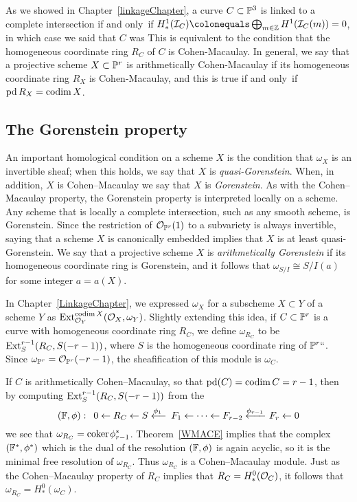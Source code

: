 As we showed in Chapter~\ref{linkageChapter}, a curve $C\subset \mathbb P^3$
is linked to a complete intersection
if and only~if
$H^1_*(\sI_C) \colonequals  \bigoplus_{m\in \ZZ} H^1(\sI_C(m)) = 0$,
in which case we said that $C$ was
%
This is equivalent to the condition that the homogeneous coordinate
ring $R_{C}$ of $C$ is Cohen-Macaulay.
In general, we say that a projective scheme $X\subset \mathbb P^{r}$
is arithmetically Cohen-Macaulay if its homogeneous coordinate ring $R_{X}$
is Cohen-Macaulay, and this is true
if and only~if $\operatorname{pd} R_X = \operatorname{codim} X$. 

\subsection*{The Gorenstein property}
An important homological condition on a scheme $X$ is the condition that
$\omega_X$ is an invertible sheaf; when this holds, we say that $X$
is \emph{quasi-Gorenstein}. When, in addition, $X$ is Cohen--Macaulay
%
%
we say that $X$ is \emph{Gorenstein}. As with the Cohen--Macaulay property,
the Gorenstein property is interpreted locally
on a scheme. 
Any scheme that is locally a
complete intersection, such as any smooth scheme, is Gorenstein. Since
the restriction
of ${\mathcal O}_{\mathbb P^r}(1)$ to a subvariety is always invertible, saying that
a scheme $X$ is canonically embedded implies that
$X$ is at least quasi-Gorenstein. We say that a projective scheme $X$ is
\emph{arithmetically Gorenstein}
%
if its homogeneous coordinate ring is Gorenstein, and it follows that
$\omega_{S/I} \cong S/I(a)$ for some integer $a = a(X)$.

In Chapter~\ref{LinkageChapter},  we expressed $\omega_X$
for a subscheme $X\subset Y$ of a scheme $Y$ as
${\rm{Ext}}^{\operatorname{codim} X}_{{\mathcal O}_Y}({\mathcal O}_X, \omega_Y)$. Slightly extending this idea,
if $C\subset \mathbb P^r$ is a curve
with homogeneous coordinate ring $R_{C}$,
we define $\omega_{R_C}$ to be ${\rm{Ext}}^{r-1}_S(R_C, S(-r-1))$, where $S$
is the homogeneous coordinate ring of $\mathbb P^r` `$.
Since $\omega_{\mathbb P^r} = {\mathcal O}_{\mathbb P^r}(-r-1)$, the sheafification of this
module is  $\omega_C$.

If $C$ is arithmetically Cohen--Macaulay, so that
$\operatorname{pd} (C) = \operatorname{codim} C = r-1$,  then by
computing ${\rm{Ext}}^{r-1}_S(R_C, S(-r-1))$ from the 
%
$$
(\FF, \phi):\quad 
0\leftarrow R_C \leftarrow S\luto{\phi_1} F_1 \leftarrow \cdots \leftarrow 
F_{r-2} \luto{\!\phi_{r-1}}\hskip-15pt-\ F_r\leftarrow 0
$$
we see that $\omega_{R_C} = {\rm{coker}\kern1pt} \phi_{r-1}^*$. 
%
Theorem~\ref{WMACE}
implies that the complex $({\mathbb F}^*, \phi^*)$ which is the dual
of the  resolution $({\mathbb F}, \phi)$ is again acyclic, so it is the minimal
free resolution of $\omega_{R_C}$. Thus
$\omega_{R_C}$ is a Cohen--Macaulay module. Just as the Cohen--Macaulay
property of
$R_C$ implies that $R_C = H^0_*({\mathcal O}_C)$, it follows that $\omega_{R_C}
= H^0_*(\omega_C)$.

